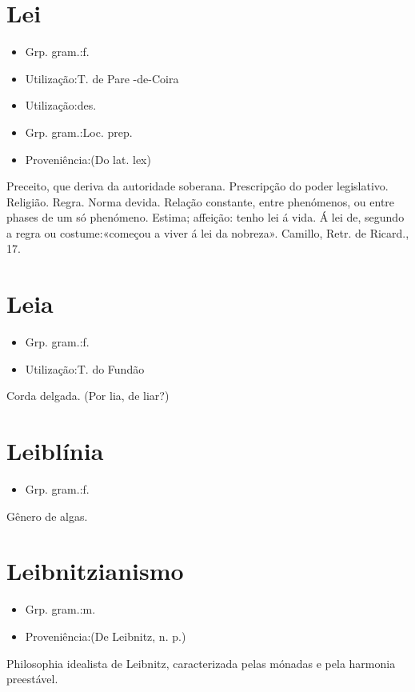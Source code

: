 \section{Lei}
\begin{itemize}
\item {Grp. gram.:f.}
\end{itemize}
\begin{itemize}
\item {Utilização:T. de Pare -de-Coira}
\end{itemize}
\begin{itemize}
\item {Utilização:des.}
\end{itemize}
\begin{itemize}
\item {Grp. gram.:Loc. prep.}
\end{itemize}
\begin{itemize}
\item {Proveniência:(Do lat. \textunderscore lex\textunderscore )}
\end{itemize}
Preceito, que deriva da autoridade soberana.
Prescripção do poder legislativo.
Religião.
Regra.
Norma devida.
Relação constante, entre phenómenos, ou entre phases de um só phenómeno.
Estima; affeição: \textunderscore tenho lei á vida\textunderscore .
\textunderscore Á lei de\textunderscore , segundo a regra ou costume:«\textunderscore começou a viver á lei da nobreza\textunderscore ». Camillo, \textunderscore Retr. de Ricard.\textunderscore , 17.
\section{Leia}
\begin{itemize}
\item {Grp. gram.:f.}
\end{itemize}
\begin{itemize}
\item {Utilização:T. do Fundão}
\end{itemize}
Corda delgada.
(Por \textunderscore lia\textunderscore , de \textunderscore liar\textunderscore ?)
\section{Leiblínia}
\begin{itemize}
\item {Grp. gram.:f.}
\end{itemize}
Gênero de algas.
\section{Leibnitzianismo}
\begin{itemize}
\item {Grp. gram.:m.}
\end{itemize}
\begin{itemize}
\item {Proveniência:(De \textunderscore Leibnitz\textunderscore , n. p.)}
\end{itemize}
Philosophia idealista de Leibnitz, caracterizada pelas mónadas e pela harmonia preestável.
